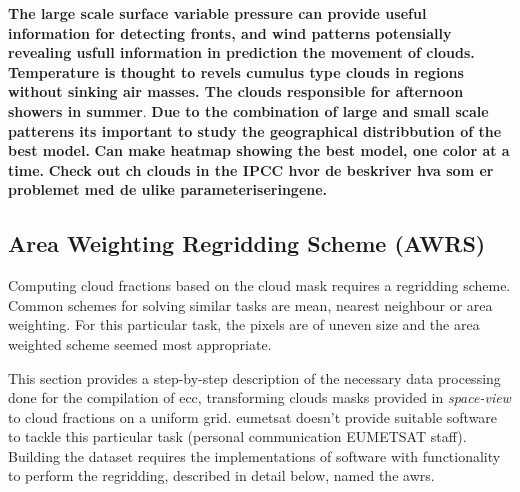 \textbf{The large scale surface variable pressure can provide useful information for detecting fronts, and wind patterns potensially revealing usfull information in prediction the movement of clouds. Temperature is thought to revels cumulus type clouds in regions without sinking air masses. The clouds responsible for afternoon showers in summer}. \textbf{Due to the combination of large and small scale patterens its important to study the geographical distribbution of the best model.}
\textbf{Can make heatmap showing the best model, one color at a time. }
\textbf{Check out ch clouds in the IPCC hvor de beskriver hva som er problemet med de ulike parameteriseringene.}

\subsection{Area Weighting Regridding Scheme (AWRS)} \label{sec:remapping}
Computing cloud fractions based on the cloud mask requires a regridding scheme. Common schemes for solving similar tasks are mean, nearest neighbour or area weighting. For this particular task, the pixels are of uneven size and the area weighted scheme seemed most appropriate. 

This section provides a step-by-step description of the necessary data processing done for the compilation of \acrshort{ecc}, transforming clouds masks provided in \textit{space-view} to cloud fractions on a uniform grid. \acrshort{eumetsat} doesn't provide suitable software to tackle this particular task (personal communication EUMETSAT staff). Building the dataset requires the implementations of software with functionality to perform the regridding, described in detail below, named the \acrfull{awrs}.

